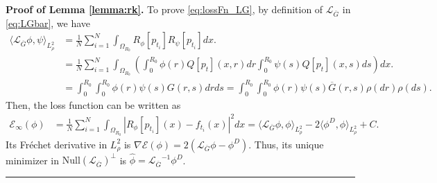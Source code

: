 \documentclass[12pt]{article}
\def\Gbar{ {\overline{G}} }
\def\LGbar{ {\mathcal{L}_{\overline{G}}}  }
\newcommand{\innerp}[1]{\langle{#1}\rangle}
\newenvironment{proof}[1][Proof]{\noindent\textbf{#1.} }{\ \rule{0.5em}{0.5em}}
\numberwithin{equation}{section}
\numberwithin{theorem}{section}
\begin{document}
\begin{proof}[Proof of Lemma \ref{lemma:rk}]
To prove \eqref{eq:lossFn_LG}, by definition of $\LGbar$ in \eqref{eq:LGbar}, we have 
\begin{equation*}   
\begin{aligned}
\innerp{\LGbar\phi,\psi}_{L^2_\rho}  & =\frac{1}{N} \sum_{i=1}^N \int_{\Omega_{R_0}} R_\phi\left[p_{t_i}\right]R_\psi\left[p_{t_i}\right] dx .\\
& =\frac{1}{N} \sum_{i=1}^N \int_{\Omega_{R_0}} \left(\int_0^{R_{0}} \phi(r) Q[p_t](x,r)dr \int_0^{R_{0}} \psi(s) Q[p_t](x,s)ds\right) dx .\\
& =\int_0^{R_{0}} \int_0^{R_{0}} \phi(r) \psi(s) G(r, s) d r d s  =\int_0^{R_{0}} \int_0^{R_{0}} \phi(r) \psi(s) \Gbar(r, s) \rho(d r) \rho(d s). 
\end{aligned}
\end{equation*}
Then, the loss function can be written as 
\begin{equation*}
\begin{aligned}
\mathcal{E}_\infty \left({\phi}\right) 
  & =\frac{1}{N} \sum_{i=1}^N \int_{\Omega_{R_0}}\left|R_{\phi}\left[p_{t_i}\right](x)-f_{t_i}(x)\right|^2 d x  = \innerp{\LGbar \phi, \phi}_{L^2_\rho} - 2\innerp{\phi^D, \phi}_{L^2_\rho} + C. 
\end{aligned}
\end{equation*}
Its Fr\'echet derivative in $L^2_\rho$ is $\nabla \mathcal{E} \left(\phi\right) =2\left(\mathcal{L}_{\Gbar} \phi-\phi^D\right)$. Thus, its unique minimizer in $\mathrm{Null}(\LGbar)^\perp$ is $\widehat \phi = \LGbar^{-1} \phi^D$. 
\end{proof}
\end{document}
